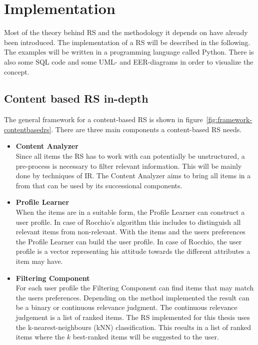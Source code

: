 

\section{Implementation}
Most of the theory behind RS and the methodology it depends on have already been introduced.
The implementation of a RS will be described in the following.
The examples will be written in a programming language called Python.
There is also some SQL code and some UML- and EER-diagrams in order to visualize the concept.

\subsection{Content based RS in-depth}
\label{sec:implementation-contentbased}
The general framework for a content-based RS is shown in figure~\ref{fig:framework-contentbasedrs}.
There are three main components a content-based RS needs.
\begin{itemize}
    \item \textbf{Content Analyzer}\\
        Since all items the RS has to work with can potentially be unstructured, a pre-process is necessary to filter relevant information.
        This will be mainly done by techniques of IR.
        The Content Analyzer aims to bring all items in a from that can be used by its successional components.
        \citep[p.~75-77]{lops:2011}
    \item \textbf{Profile Learner}\\
        When the items are in a suitable form, the Profile Learner can construct a user profile.
        In case of Rocchio's algorithm this includes to distinguish all relevant items from non-relevant.
        With the items and the users preferences the Profile Learner can build the user profile.
        In case of Rocchio, the user profile is a vector representing his attitude towards the different attributes a item may have.
        \citep[p.~75-77]{lops:2011}
    \item \textbf{Filtering Component}\\
        For each user profile the Filtering Component can find items that may match the users preferences.
        Depending on the method implemented the result can be a binary or continuous relevance judgment.
        The continuous relevance judgement is a list of ranked items.
        \citep[p.~75-77]{lops:2011}
        The RS implemented for this thesis uses the k-nearest-neighbours (kNN) classification.
        This results in a list of ranked items where the $k$ best-ranked items will be suggested to the user.
\end{itemize}


